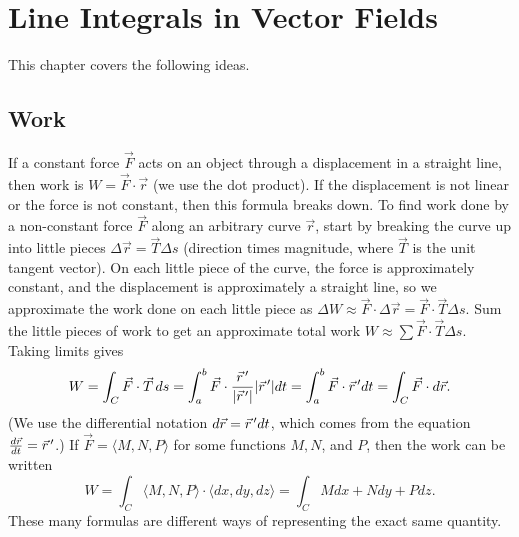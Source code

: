 
\chapter{Line Integrals in Vector Fields}

This chapter covers the following ideas. 


\section{Work}

If a constant force $\vec F$ acts on an object through a displacement
in a straight line, then work is {$ W= \vec F\cdot \vec r $} (we use the
dot product).  If the displacement is not linear or the force is not
constant, then this formula breaks down. To find work done by a
non-constant force $\vec F$ along an arbitrary curve $\vec r$, start
by breaking the curve up into little pieces $\Delta \vec r = \vec T \Delta s$
(direction times magnitude, where $\vec T$ is the unit tangent
vector). On each little piece of the curve, the force is approximately
constant, and the displacement is approximately a straight line, so we
approximate the work done on each little piece as {$ \Delta W \approx \vec F \cdot \Delta
\vec r = \vec F \cdot \vec T \Delta s $}.  Sum the little pieces of work to get an
approximate total work {$ W \approx \sum \vec F \cdot \vec T \Delta s $}.  Taking limits
gives 
$$%
W = \int_C \vec F\cdot \vec T \,ds 
= \int_a^b\vec F\cdot \frac{\vec r\vp}{|\vec r\vp|}|\vec r\vp| dt 
= \int_a^b\vec F\cdot \vec r\vp dt 
= \int_C \vec F\cdot d\vec r.$$
(We use the differential notation {$ d\vec r= \vec r^{\,\prime} dt $}, which
comes from the equation {$ \frac{d\vec r}{dt} = \vec r^{\,\prime} $}.)
If {$ \vec F = \langle M,N,P\rangle $} for some functions $M,N$, and
$P$, then the work can be written 
$$W = \int_C \langle M,N,P\rangle\cdot\langle dx,dy,dz\rangle 
= \int_C Mdx+Ndy+Pdz.$$ These many formulas are different ways of
representing the exact same quantity.


